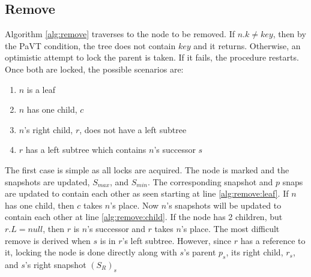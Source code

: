 \documentclass[11pt]{article}
\theoremstyle{definition}
\theoremstyle{theorem}
\begin{document}
\subsection{Remove}
Algorithm \ref{alg:remove} traverses to the node to be removed. If $n.k\neq key$, then by the PaVT condition, the tree does not contain $key$ and it returns. Otherwise, an optimistic attempt to lock the parent is taken. If it fails, the procedure restarts. Once both are locked, the possible scenarios are:
\begin{enumerate}
\item $n$ is a leaf
\item $n$ has one child, $c$
\item $n$'s right child, $r$, does not have a left subtree
\item $r$ has a left subtree which contains $n$'s successor $s$
\end{enumerate}
The first case is simple as all locks are acquired. The node is marked and the snapshots are updated, $S_{max}$, and $S_{min}$. The corresponding snapshot and $p$ snaps are updated to contain each other as seen starting at line \ref{alg:remove:leaf}. If $n$ has one child, then $c$ takes $n$'s place. Now $n$'s snapshots will be updated to contain each other at line \ref{alg:remove:child}. If the node has 2 children, but $r.L = null$, then $r$ is $n$'s successor and $r$ takes $n$'s place. The most difficult remove is derived when $s$ is in $r$'s left subtree. However, since $r$ has a reference to it, locking the node is done directly along with $s$'s parent $p_s$, its right child, $r_s$, and $s$'s right snapshot $(S_R)_s$
\end{document}
